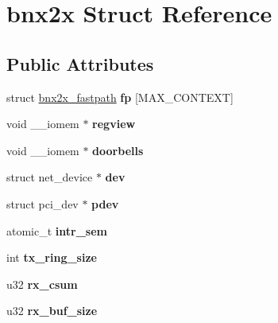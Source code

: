\hypertarget{structbnx2x}{
\section{bnx2x Struct Reference}
\label{structbnx2x}
}
\subsection*{Public Attributes}
\begin{DoxyCompactItemize}
\item 
\hypertarget{structbnx2x_a108a56c6f6a0bddaac68f14bd4910b58}{
struct \hyperlink{structbnx2x__fastpath}{bnx2x\_\-fastpath} {\bfseries fp} \mbox{[}MAX\_\-CONTEXT\mbox{]}}
\label{structbnx2x_a108a56c6f6a0bddaac68f14bd4910b58}

\item 
\hypertarget{structbnx2x_ae2154043eaa79d51eb8f62e2d8f0bfbc}{
void \_\-\_\-iomem $\ast$ {\bfseries regview}}
\label{structbnx2x_ae2154043eaa79d51eb8f62e2d8f0bfbc}

\item 
\hypertarget{structbnx2x_a0db5855bfd09305dc447fb1ca98d632a}{
void \_\-\_\-iomem $\ast$ {\bfseries doorbells}}
\label{structbnx2x_a0db5855bfd09305dc447fb1ca98d632a}

\item 
\hypertarget{structbnx2x_a9dddbd784046c133584bbedbd52103dd}{
struct net\_\-device $\ast$ {\bfseries dev}}
\label{structbnx2x_a9dddbd784046c133584bbedbd52103dd}

\item 
\hypertarget{structbnx2x_a73f2bdedae8f6d1fd6851b3a87864087}{
struct pci\_\-dev $\ast$ {\bfseries pdev}}
\label{structbnx2x_a73f2bdedae8f6d1fd6851b3a87864087}

\item 
\hypertarget{structbnx2x_a4af0cc78b403c7c402e51d10df9bb4a9}{
atomic\_\-t {\bfseries intr\_\-sem}}
\label{structbnx2x_a4af0cc78b403c7c402e51d10df9bb4a9}

\item 
\hypertarget{structbnx2x_ae43739c2ecaf88934fb476678cc28b2a}{
int {\bfseries tx\_\-ring\_\-size}}
\label{structbnx2x_ae43739c2ecaf88934fb476678cc28b2a}

\item 
\hypertarget{structbnx2x_a951917659c000ec78efaa8119a3bfc6a}{
u32 {\bfseries rx\_\-csum}}
\label{structbnx2x_a951917659c000ec78efaa8119a3bfc6a}

\item 
\hypertarget{structbnx2x_af09ab44ea5fd96eae2d98865483833bc}{
u32 {\bfseries rx\_\-buf\_\-size}}
\label{structbnx2x_af09ab44ea5fd96eae2d98865483833bc}


\end{DoxyCompactItemize}
